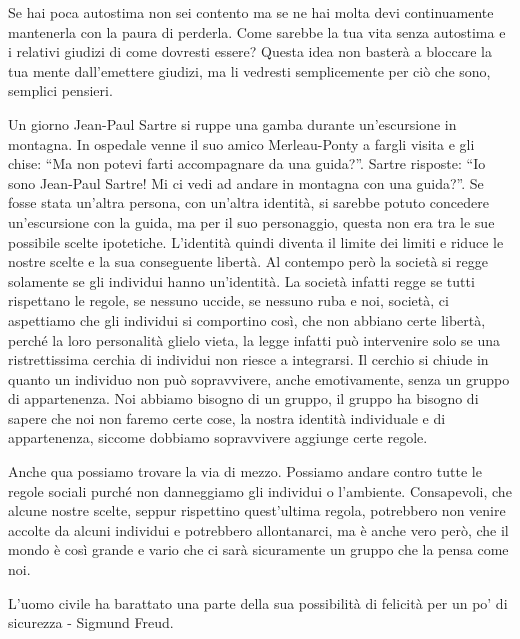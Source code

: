 \documentclass[12pt]{book} %
\begin{document}
Se hai poca autostima non sei contento ma se ne hai molta devi continuamente mantenerla con la paura di perderla. Come
sarebbe la tua vita senza autostima e i relativi giudizi di come dovresti essere? Questa idea non basterà a bloccare la
tua mente dall'emettere giudizi, ma li vedresti semplicemente per ciò che sono, semplici pensieri.

\begin{mdframed}[linewidth=1pt]
Un giorno Jean-Paul Sartre si ruppe una gamba durante un'escursione in montagna. In ospedale venne
il suo amico Merleau-Ponty a fargli visita e gli chise: “Ma non potevi farti accompagnare da una guida?”. Sartre
risposte: “Io sono Jean-Paul Sartre! Mi ci vedi ad andare in montagna con una guida?”. Se fosse stata
un'altra persona, con un'altra identità, si sarebbe potuto concedere
un'escursione con la guida, ma per il suo personaggio, questa non era tra le sue possibile scelte
ipotetiche. L'identità quindi diventa il limite dei limiti e riduce le nostre scelte e la sua
conseguente libertà. Al contempo però la società si regge solamente se gli individui hanno
un'identità. La società infatti regge se tutti rispettano le regole, se nessuno uccide, se nessuno
ruba e noi, società, ci aspettiamo che gli individui si comportino così, che non abbiano certe libertà, perché la loro
personalità glielo vieta, la legge infatti può intervenire solo se una ristrettissima cerchia di individui non riesce a
integrarsi. Il cerchio si chiude in quanto un individuo non può sopravvivere, anche emotivamente, senza un gruppo di
appartenenza. Noi abbiamo bisogno di un gruppo, il gruppo ha bisogno di sapere che noi non faremo certe cose, la nostra
identità individuale e di appartenenza, siccome dobbiamo sopravvivere aggiunge certe regole. 

Anche qua possiamo trovare la via di mezzo. Possiamo andare contro tutte le regole sociali purché non danneggiamo gli
individui o l'ambiente. Consapevoli, che alcune nostre scelte, seppur rispettino
quest'ultima regola, potrebbero non venire accolte da alcuni individui e potrebbero allontanarci,
ma è anche vero però, che il mondo è così grande e vario che ci sarà sicuramente un gruppo che la pensa come noi.

L'uomo civile ha barattato una parte della sua possibilità di felicità per un po' di sicurezza - Sigmund Freud.
\end{mdframed}
\end{document}
